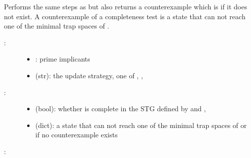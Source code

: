 \documentclass[letterpaper,10pt,english]{sphinxmanual}
\begin{document}
\begin{fulllineitems}
\label{\detokenize{AttractorDetection:PyBoolNet.AttractorDetection.completeness_with_counterexample}}
Performs the same steps as {\hyperref[\detokenize{AttractorDetection:completeness}]{}} but also returns a counterexample which is  if it does not exist.
A counterexample of a completeness test is a state that can not reach one of the minimal trap spaces of .
\begin{description}
\item[{:}] \leavevmode\begin{itemize}
\item {} 
: prime implicants

\item {} 
 (str): the update strategy, one of , , 

\end{itemize}

\item[{:}] \leavevmode\begin{itemize}
\item {} 
 (bool): whether  is complete in the STG defined by  and ,

\item {} 
 (dict): a state that can not reach one of the minimal trap spaces of  or  if no counterexample exists

\end{itemize}

\end{description}

:

\begin{sphinxVerbatim}[commandchars=\\\{\}]
    
\end{sphinxVerbatim}

\end{fulllineitems}
\end{document}
